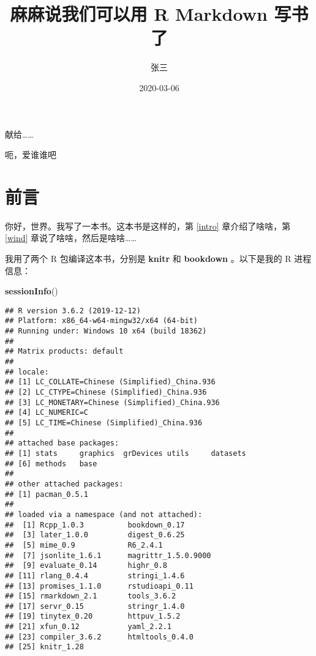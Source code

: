 \documentclass[]{ctexbook}
\title{麻麻说我们可以用 R Markdown 写书了}
\author{张三}
\date{2020-03-06}
\newenvironment{Shaded}{\begin{snugshade}}{\end{snugshade}}
\newcommand{\KeywordTok}[1]{\textcolor[rgb]{0.13,0.29,0.53}{\textbf{#1}}}
\newcommand{\NormalTok}[1]{#1}
\begin{document}
\maketitle


\thispagestyle{empty}

\begin{center}
献给……

呃，爱谁谁吧
\end{center}

\setlength{\abovedisplayskip}{-5pt}
\setlength{\abovedisplayshortskip}{-5pt}

{
\setcounter{tocdepth}{2}
\tableofcontents
}
\listoftables
\listoffigures
\hypertarget{ux524dux8a00}{%
\chapter*{前言}\label{ux524dux8a00}}


你好，世界。我写了一本书。这本书是这样的，第 \ref{intro} 章介绍了啥啥，第 \ref{wind} 章说了啥啥，然后是啥啥\ldots\ldots{}

我用了两个 R 包编译这本书，分别是 \textbf{knitr} \citep{xie2015} 和 \textbf{bookdown} \citep{R-bookdown}。以下是我的 R 进程信息：

\begin{Shaded}
\begin{Highlighting}[]
\KeywordTok{sessionInfo}\NormalTok{()}
\end{Highlighting}
\end{Shaded}

\begin{verbatim}
## R version 3.6.2 (2019-12-12)
## Platform: x86_64-w64-mingw32/x64 (64-bit)
## Running under: Windows 10 x64 (build 18362)
## 
## Matrix products: default
## 
## locale:
## [1] LC_COLLATE=Chinese (Simplified)_China.936 
## [2] LC_CTYPE=Chinese (Simplified)_China.936   
## [3] LC_MONETARY=Chinese (Simplified)_China.936
## [4] LC_NUMERIC=C                              
## [5] LC_TIME=Chinese (Simplified)_China.936    
## 
## attached base packages:
## [1] stats     graphics  grDevices utils     datasets 
## [6] methods   base     
## 
## other attached packages:
## [1] pacman_0.5.1
## 
## loaded via a namespace (and not attached):
##  [1] Rcpp_1.0.3          bookdown_0.17      
##  [3] later_1.0.0         digest_0.6.25      
##  [5] mime_0.9            R6_2.4.1           
##  [7] jsonlite_1.6.1      magrittr_1.5.0.9000
##  [9] evaluate_0.14       highr_0.8          
## [11] rlang_0.4.4         stringi_1.4.6      
## [13] promises_1.1.0      rstudioapi_0.11    
## [15] rmarkdown_2.1       tools_3.6.2        
## [17] servr_0.15          stringr_1.4.0      
## [19] tinytex_0.20        httpuv_1.5.2       
## [21] xfun_0.12           yaml_2.2.1         
## [23] compiler_3.6.2      htmltools_0.4.0    
## [25] knitr_1.28
\end{verbatim}
\end{document}
